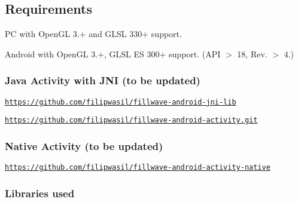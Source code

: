 \subsection*{{\bfseries Requirements}}


\begin{DoxyItemize}
\item P\+C with Open\+G\+L 3.+ and G\+L\+S\+L 330+ support.
\item Android with Open\+G\+L 3.+, G\+L\+S\+L E\+S 300+ support. (A\+P\+I $>$ 18, Rev. $>$ 4.)
\end{DoxyItemize}

\subsubsection*{{\bfseries Java Activity with J\+N\+I (to be updated)}}


\begin{DoxyItemize}
\item \href{https://github.com/filipwasil/fillwave-android-jni-lib}{\tt https\+://github.\+com/filipwasil/fillwave-\/android-\/jni-\/lib}
\item \href{https://github.com/filipwasil/fillwave-android-activity.git}{\tt https\+://github.\+com/filipwasil/fillwave-\/android-\/activity.\+git}
\end{DoxyItemize}

\subsubsection*{{\bfseries Native Activity (to be updated)}}


\begin{DoxyItemize}
\item \href{https://github.com/filipwasil/fillwave-android-activity-native}{\tt https\+://github.\+com/filipwasil/fillwave-\/android-\/activity-\/native}
\end{DoxyItemize}

\subsubsection*{{\bfseries Libraries used}}


